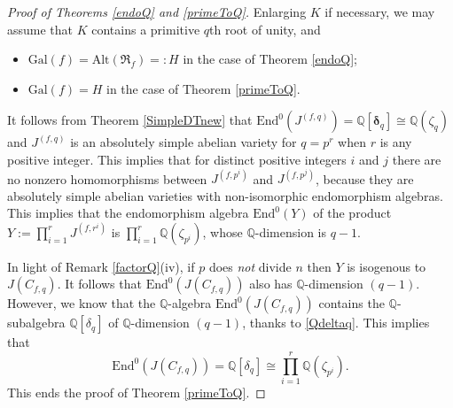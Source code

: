 \documentclass[12pt,a4paper,reqno]{amsart}
\def\Q{{\mathbb Q}}
\def\R{{\mathbb R}}
\def\R{{\mathfrak R}}
\def\Gal{\mathrm{Gal}}
\def\Alt{\mathrm{Alt}}
\def\End{\mathrm{End}}
\def\delt{{\boldsymbol \delta}}
\theoremstyle{definition}
\begin{document}
\begin{proof}[Proof of Theorems \ref{endoQ} and \ref{primeToQ}]


Enlarging $K$ if necessary, we may assume that $K$ contains a primitive $q$th root of unity, and

\begin{itemize}
\item
$\Gal(f)=\Alt(\R_f)=:H$ in the case of Theorem \ref{endoQ};
\item
 $\Gal(f)=H$ in the case of Theorem \ref{primeToQ}.
\end{itemize}
It follows from Theorem \ref{SimpleDTnew} that  $\End^0(J^{(f,q)})=\Q[\delt_q]\cong \Q(\zeta_q)$
and $J^{(f,q)}$ is an absolutely simple abelian variety
for $q=p^r$ when $r$ is any positive integer. This implies that for distinct positive integers $i$  and $j$ there are no nonzero homomorphisms
between $J^{(f,p^i)}$ and $J^{(f,p^j)}$, because they are absolutely simple abelian varieties with non-isomorphic endomorphism algebras.
This implies that the endomorphism algebra $\End^0(Y)$ of the product $Y:=\prod_{i=1}^r J^{(f,r^i)}$ is 
$\prod_{i=1}^r \Q(\zeta_{p^i})$, whose $\Q$-dimension is $q-1$.

In light of  Remark \ref{factorQ}(iv), 
if $p$ does {\sl not} divide $n$ then $Y$ is isogenous to $J(C_{f,q})$.
It follows that $\End^0(J(C_{f,q}))$ also has $\Q$-dimension $(q-1)$. However, we know that the $\Q$-algebra $\End^0(J(C_{f,q}))$
contains the $\Q$-subalgebra $\Q[\delta_q]$ of $\Q$-dimension $(q-1)$, thanks to \eqref{Qdeltaq}. This implies that
$$\End^0(J(C_{f,q}))=\Q[\delta_q]\cong \prod_{i=1}^r \Q(\zeta_{p^i}).$$
This ends the proof of Theorem \ref{primeToQ}.


\end{proof}
\end{document}
